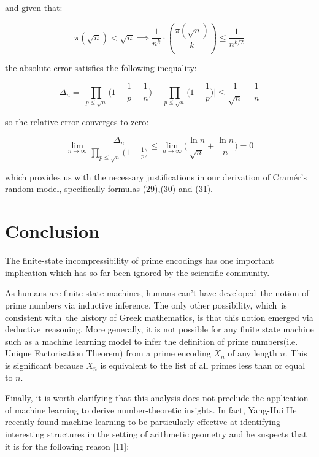 \documentclass{article}
\begin{document}
and given that:

\begin{equation}
\pi(\sqrt{n}) < \sqrt{n} \implies \frac{1}{n^k} \cdot {\pi(\sqrt{n}) \choose k} \leq \frac{1}{n^{k/2}}
\end{equation}

the absolute error satisfies the following inequality:

\begin{equation}
\Delta_n = \Big\lvert \prod_{p \leq \sqrt{n}} \big(1- \frac{1}{p}+\frac{1}{n}\big) - \prod_{p \leq \sqrt{n}} \big(1- \frac{1}{p}\big)  \Big\rvert \leq \frac{1}{\sqrt{n}} + \frac{1}{n}
\end{equation}

so the relative error converges to zero:

\begin{equation}
\lim_{n \to \infty} \frac{\Delta_n}{\prod_{p \leq \sqrt{n}} \big(1- \frac{1}{p}\big)} \leq \lim_{n \to \infty} \big(\frac{\ln n}{\sqrt{n}} + \frac{\ln n}{n}\big) = 0
\end{equation}

which provides us with the necessary justifications in our derivation of Cramér's random model, specifically
formulas (29),(30) and (31).

\newpage 

\section{Conclusion}

The finite-state incompressibility of prime encodings has one important implication which has so far been ignored by the scientific community. 

As humans are finite-state machines, humans can't have developed the notion of prime numbers via inductive inference. The only other possibility, which is consistent with the history of Greek mathematics, is that this notion emerged via deductive reasoning. More generally, it is not possible for any finite state machine such as a machine learning model to infer the definition of prime numbers(i.e. Unique Factorisation Theorem) from a prime encoding $X_n$ of any length $n$. This is significant because $X_n$ is equivalent to the list of all primes less than or equal to $n$. 

Finally, it is worth clarifying that this analysis does not preclude the application of machine learning to derive number-theoretic insights. In fact, Yang-Hui He recently found machine learning to be particularly effective at identifying interesting structures in the setting of arithmetic geometry and he suspects that it is for the following reason [11]: 
\end{document}
